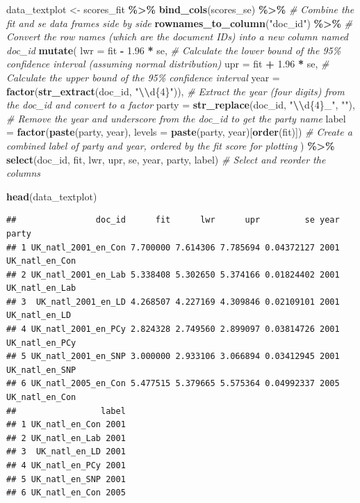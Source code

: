 \documentclass[
]{book}
\newenvironment{Shaded}{\begin{snugshade}}{\end{snugshade}}
\newcommand{\AttributeTok}[1]{\textcolor[rgb]{0.13,0.29,0.53}{#1}}
\newcommand{\CommentTok}[1]{\textcolor[rgb]{0.56,0.35,0.01}{\textit{#1}}}
\newcommand{\FloatTok}[1]{\textcolor[rgb]{0.00,0.00,0.81}{#1}}
\newcommand{\FunctionTok}[1]{\textcolor[rgb]{0.13,0.29,0.53}{\textbf{#1}}}
\newcommand{\NormalTok}[1]{#1}
\newcommand{\OtherTok}[1]{\textcolor[rgb]{0.56,0.35,0.01}{#1}}
\newcommand{\SpecialCharTok}[1]{\textcolor[rgb]{0.81,0.36,0.00}{\textbf{#1}}}
\newcommand{\StringTok}[1]{\textcolor[rgb]{0.31,0.60,0.02}{#1}}
\begin{document}
\begin{Shaded}
\begin{Highlighting}[]
\NormalTok{data\_textplot }\OtherTok{\textless{}{-}}\NormalTok{ scores\_fit }\SpecialCharTok{\%\textgreater{}\%}
  \FunctionTok{bind\_cols}\NormalTok{(scores\_se) }\SpecialCharTok{\%\textgreater{}\%} \CommentTok{\# Combine the \textquotesingle{}fit\textquotesingle{} and \textquotesingle{}se\textquotesingle{} data frames side by side}
  \FunctionTok{rownames\_to\_column}\NormalTok{(}\StringTok{"doc\_id"}\NormalTok{) }\SpecialCharTok{\%\textgreater{}\%} \CommentTok{\# Convert the row names (which are the document IDs) into a new column named \textquotesingle{}doc\_id\textquotesingle{}}
  \FunctionTok{mutate}\NormalTok{(}
    \AttributeTok{lwr =}\NormalTok{ fit }\SpecialCharTok{{-}} \FloatTok{1.96} \SpecialCharTok{*}\NormalTok{ se,}
    \CommentTok{\# Calculate the lower bound of the 95\% confidence interval (assuming normal distribution)}
    \AttributeTok{upr =}\NormalTok{ fit }\SpecialCharTok{+} \FloatTok{1.96} \SpecialCharTok{*}\NormalTok{ se,}
    \CommentTok{\# Calculate the upper bound of the 95\% confidence interval}
    \AttributeTok{year =} \FunctionTok{factor}\NormalTok{(}\FunctionTok{str\_extract}\NormalTok{(doc\_id, }\StringTok{"}\SpecialCharTok{\textbackslash{}\textbackslash{}}\StringTok{d\{4\}"}\NormalTok{)),}
    \CommentTok{\# Extract the year (four digits) from the doc\_id and convert to a factor}
    \AttributeTok{party =} \FunctionTok{str\_replace}\NormalTok{(doc\_id, }\StringTok{"}\SpecialCharTok{\textbackslash{}\textbackslash{}}\StringTok{d\{4\}\_"}\NormalTok{, }\StringTok{""}\NormalTok{),}
    \CommentTok{\# Remove the year and underscore from the doc\_id to get the party name}
    \AttributeTok{label =} \FunctionTok{factor}\NormalTok{(}\FunctionTok{paste}\NormalTok{(party, year), }\AttributeTok{levels =} \FunctionTok{paste}\NormalTok{(party, year)[}\FunctionTok{order}\NormalTok{(fit)]) }\CommentTok{\# Create a combined label of party and year, ordered by the \textquotesingle{}fit\textquotesingle{} score for plotting}
\NormalTok{  ) }\SpecialCharTok{\%\textgreater{}\%}
  \FunctionTok{select}\NormalTok{(doc\_id, fit, lwr, upr, se, year, party, label) }\CommentTok{\# Select and reorder the columns}

\FunctionTok{head}\NormalTok{(data\_textplot)}
\end{Highlighting}
\end{Shaded}

\begin{verbatim}
##                doc_id      fit      lwr      upr         se year          party
## 1 UK_natl_2001_en_Con 7.700000 7.614306 7.785694 0.04372127 2001 UK_natl_en_Con
## 2 UK_natl_2001_en_Lab 5.338408 5.302650 5.374166 0.01824402 2001 UK_natl_en_Lab
## 3  UK_natl_2001_en_LD 4.268507 4.227169 4.309846 0.02109101 2001  UK_natl_en_LD
## 4 UK_natl_2001_en_PCy 2.824328 2.749560 2.899097 0.03814726 2001 UK_natl_en_PCy
## 5 UK_natl_2001_en_SNP 3.000000 2.933106 3.066894 0.03412945 2001 UK_natl_en_SNP
## 6 UK_natl_2005_en_Con 5.477515 5.379665 5.575364 0.04992337 2005 UK_natl_en_Con
##                 label
## 1 UK_natl_en_Con 2001
## 2 UK_natl_en_Lab 2001
## 3  UK_natl_en_LD 2001
## 4 UK_natl_en_PCy 2001
## 5 UK_natl_en_SNP 2001
## 6 UK_natl_en_Con 2005
\end{verbatim}
\end{document}
